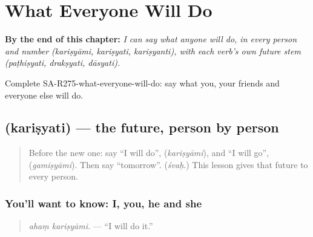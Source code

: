 
\chapter{What Everyone Will Do}
\label{ch:sa-what-everyone-will-do}

\begin{chapteropening}
\textbf{By the end of this chapter:} \emph{I can say what anyone will do, in every person and number (kariṣyāmi, kariṣyati, kariṣyanti), with each verb's own future stem (paṭhiṣyati, drakṣyati, dāsyati).}

Complete SA-R275-what-everyone-will-do: say what you, your friends and everyone else will do.
\end{chapteropening}

\section[\texorpdfstring{\sk{करिष्यति} (kariṣyati)}{करिष्यति (kariṣyati)}]{ (kariṣyati) — the future, person by person}

\label{lesson:SA-C275-karisyati}



\begin{quote}
Before the new one: say \textquotedblleft{}I will do\textquotedblright{}, \textbf{} (\emph{kariṣyāmi}), and \textquotedblleft{}I will go\textquotedblright{}, \textbf{} (\emph{gamiṣyāmi}). Then say \textquotedblleft{}tomorrow\textquotedblright{}. (\emph{śvaḥ}.) This lesson gives that future to every person.
\end{quote}

\subsection*{You'll want to know: I, you, he and she}
\begin{quote}
\textbf{ }
\end{quote}

\begin{quote}
\emph{ahaṃ kariṣyāmi.} — \textquotedblleft{}I will do it.\textquotedblright{}
\end{quote}


